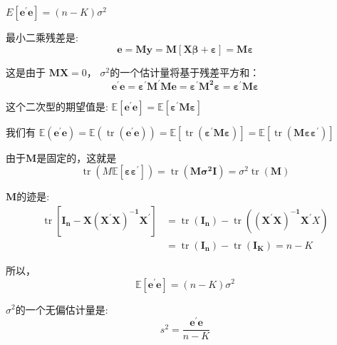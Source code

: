 \begin{mypty}
    $ E\left[ \boldsymbol{e^{\prime} e} \right]=(n-K) \sigma^{2} $
    \begin{myproof}
        最小二乘残差是:
        $$ \boldsymbol{e=M y=M[X \beta+\varepsilon]=M \varepsilon} $$

        这是由于 $ \boldsymbol{MX} = 0 $， $ \sigma^{2} $的一个估计量将基于残差平方和：
        $$ \boldsymbol{ e^{\prime} e=\varepsilon^{\prime} M^{\prime} M e=\varepsilon^{\prime} M^{2} \varepsilon=\varepsilon^{\prime} M \varepsilon }$$

        这个二次型的期望值是: $ \mathbb{E} \left[ \boldsymbol{e^{\prime} e}\right]
                                = \mathbb{E}\left[ \boldsymbol{\varepsilon^{\prime} M \varepsilon} \right] $

        我们有 \quad $ \mathbb{E}\left(\boldsymbol{e^{\prime} e}\right)
        =\mathbb{E}\left(\operatorname{tr}\left(\boldsymbol{e^{\prime} e}\right)\right)
        =\mathbb{E}\left[\operatorname{tr}\left(\boldsymbol{\varepsilon^{\prime} M \varepsilon}\right)\right]
        =\mathbb{E}\left[\operatorname{tr}\left(\boldsymbol{M \varepsilon \varepsilon^{\prime}}\right)\right] $

        由于$ \boldsymbol{M} $是固定的，这就是
        $$  \operatorname{tr}\left(M \mathbb{E}\left[ \boldsymbol{\varepsilon \varepsilon^{\prime}}\right]\right)
                =\operatorname{tr}\left(\boldsymbol{M \sigma^{2} I}\right)=\sigma^{2} \operatorname{tr}(\boldsymbol{M}) $$

        $ \boldsymbol{M} $的迹是:
        $$ \begin{aligned}
            \operatorname{tr}\left[\boldsymbol{I_{n}-X\left(X^{\prime} X\right)^{-1} X^{\prime}}\right] 
            &=\operatorname{tr}\left(\boldsymbol{I_{n}}\right)-\operatorname{tr}\left(\boldsymbol{\left(X^{\prime} X\right)^{-1} X^{\prime}} X\right) \\
            &=\operatorname{tr}\left(\boldsymbol{I_{n}}\right)-\operatorname{tr}\left(\boldsymbol{I_{K}}\right)=n-K
           \end{aligned} $$

        所以，
        $$ \mathbb{E}\left[ \boldsymbol{e^{\prime} e}\right] = (n-K) \sigma^{2} $$ 

        $ \sigma^{2} $的一个无偏估计量是:
        \begin{equation} 
            s^{2}=\frac{\boldsymbol{e^{\prime} e}}{n-K} 
            \label{eq 5.4.2}
        \end{equation}


\end{myproof}
\end{mypty}
